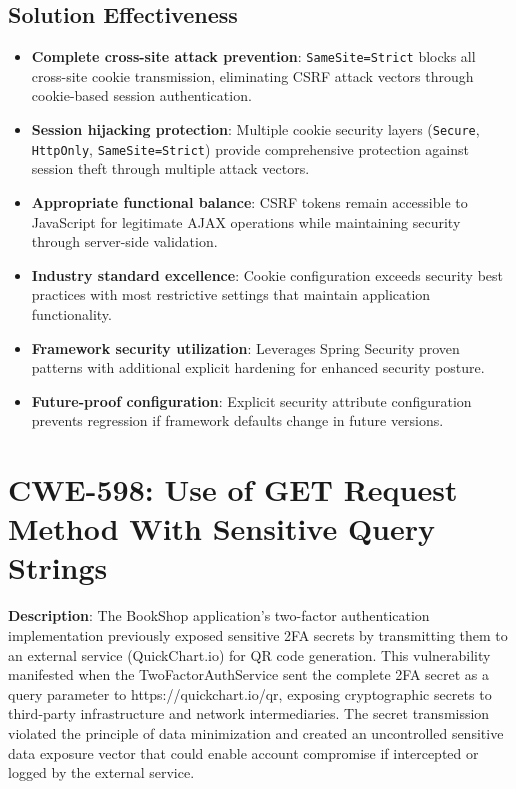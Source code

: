 \documentclass[]{UCD_CS_FYP_Report}
\begin{document}
\subsection{Solution Effectiveness}
\begin{itemize}
	\item \textbf{Complete cross-site attack prevention}: \texttt{SameSite=Strict} blocks all cross-site cookie transmission, eliminating CSRF attack vectors through cookie-based session authentication.
	\item \textbf{Session hijacking protection}: Multiple cookie security layers (\texttt{Secure}, \texttt{HttpOnly}, \texttt{SameSite=Strict}) provide comprehensive protection against session theft through multiple attack vectors.
	\item \textbf{Appropriate functional balance}: CSRF tokens remain accessible to JavaScript for legitimate AJAX operations while maintaining security through server-side validation.
	\item \textbf{Industry standard excellence}: Cookie configuration exceeds security best practices with most restrictive settings that maintain application functionality.
	\item \textbf{Framework security utilization}: Leverages Spring Security proven patterns with additional explicit hardening for enhanced security posture.
	\item \textbf{Future-proof configuration}: Explicit security attribute configuration prevents regression if framework defaults change in future versions.
\end{itemize}

\section{CWE-598: Use of GET Request Method With Sensitive Query Strings}

	\textbf{Description}: The BookShop application's two-factor authentication implementation previously exposed sensitive 2FA secrets by transmitting them to an external service (QuickChart.io) for QR code generation. This vulnerability manifested when the TwoFactorAuthService sent the complete 2FA secret as a query parameter to https://quickchart.io/qr, exposing cryptographic secrets to third-party infrastructure and network intermediaries. The secret transmission violated the principle of data minimization and created an uncontrolled sensitive data exposure vector that could enable account compromise if intercepted or logged by the external service.
\end{document}
